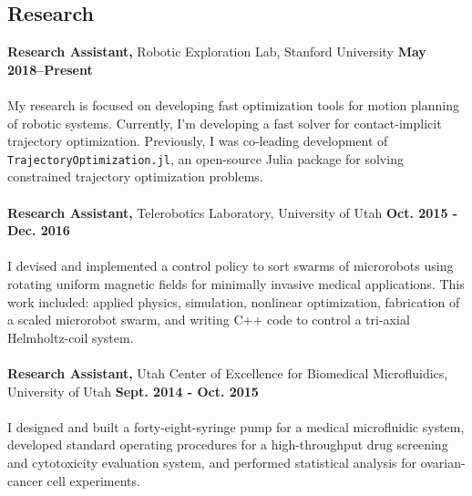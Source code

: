 \documentclass[margin,line]{res}
\begin{document}
\begin{resume}
\section{\sc Research}
{\bf Research Assistant,} Robotic Exploration Lab, Stanford University
\hfill {\bf May 2018--Present}\\
\\
My research is focused on developing fast optimization tools for motion planning of robotic systems. Currently, I'm developing a fast solver for contact-implicit trajectory optimization. Previously, I was co-leading development of \texttt{TrajectoryOptimization.jl}, an open-source Julia package for solving constrained trajectory optimization problems. \\
\\
{\bf Research Assistant,} Telerobotics Laboratory, University of Utah
\hfill {\bf Oct. 2015 - Dec. 2016}\\
\\
I devised and implemented a control policy to sort swarms of microrobots using rotating uniform
magnetic fields for minimally invasive medical applications. This work included: applied physics, simulation, nonlinear optimization, fabrication of a scaled microrobot swarm, and writing C++ code to control a tri-axial Helmholtz-coil system.\\
\\
{\bf Research Assistant,} Utah Center of Excellence for Biomedical Microfluidics, University of Utah
\hfill {\bf Sept. 2014 - Oct. 2015}\\
\\
I designed and built a forty-eight-syringe pump for a medical microfluidic system, developed standard operating procedures for a high-throughput drug screening and cytotoxicity evaluation system, and performed statistical analysis for ovarian-cancer cell experiments.\\


\end{resume}
\end{document}

